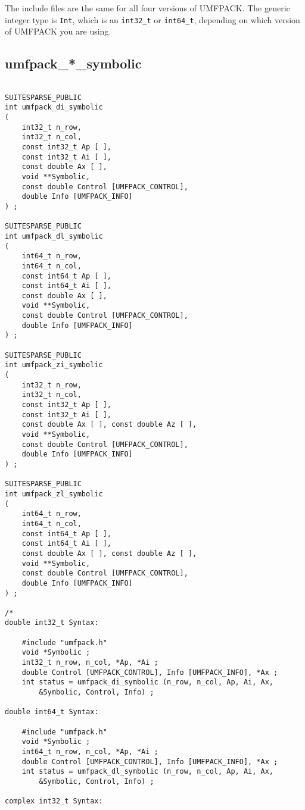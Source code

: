 \documentclass[11pt]{article}
\begin{document}
The include files are the same for all four versions of
UMFPACK.  The generic integer type is {\tt Int}, which is an \verb'int32_t' or
\verb'int64_t', depending on which version of UMFPACK you are using.

\subsection{umfpack\_*\_symbolic}


{\footnotesize
\begin{verbatim}

SUITESPARSE_PUBLIC
int umfpack_di_symbolic
(
    int32_t n_row,
    int32_t n_col,
    const int32_t Ap [ ],
    const int32_t Ai [ ],
    const double Ax [ ],
    void **Symbolic,
    const double Control [UMFPACK_CONTROL],
    double Info [UMFPACK_INFO]
) ;

SUITESPARSE_PUBLIC
int umfpack_dl_symbolic
(
    int64_t n_row,
    int64_t n_col,
    const int64_t Ap [ ],
    const int64_t Ai [ ],
    const double Ax [ ],
    void **Symbolic,
    const double Control [UMFPACK_CONTROL],
    double Info [UMFPACK_INFO]
) ;

SUITESPARSE_PUBLIC
int umfpack_zi_symbolic
(
    int32_t n_row,
    int32_t n_col,
    const int32_t Ap [ ],
    const int32_t Ai [ ],
    const double Ax [ ], const double Az [ ],
    void **Symbolic,
    const double Control [UMFPACK_CONTROL],
    double Info [UMFPACK_INFO]
) ;

SUITESPARSE_PUBLIC
int umfpack_zl_symbolic
(
    int64_t n_row,
    int64_t n_col,
    const int64_t Ap [ ],
    const int64_t Ai [ ],
    const double Ax [ ], const double Az [ ],
    void **Symbolic,
    const double Control [UMFPACK_CONTROL],
    double Info [UMFPACK_INFO]
) ;

/*
double int32_t Syntax:

    #include "umfpack.h"
    void *Symbolic ;
    int32_t n_row, n_col, *Ap, *Ai ;
    double Control [UMFPACK_CONTROL], Info [UMFPACK_INFO], *Ax ;
    int status = umfpack_di_symbolic (n_row, n_col, Ap, Ai, Ax,
        &Symbolic, Control, Info) ;

double int64_t Syntax:

    #include "umfpack.h"
    void *Symbolic ;
    int64_t n_row, n_col, *Ap, *Ai ;
    double Control [UMFPACK_CONTROL], Info [UMFPACK_INFO], *Ax ;
    int status = umfpack_dl_symbolic (n_row, n_col, Ap, Ai, Ax,
        &Symbolic, Control, Info) ;

complex int32_t Syntax:


\end{verbatim}}
\end{document}
